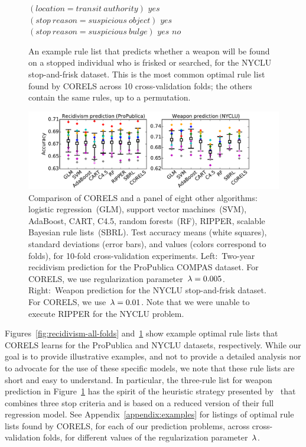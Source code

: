 \begin{figure}[t!]
\begin{algorithmic}
\State \bif $(location = transit~authority)$ \bthen $yes$
\State \belif $(stop~reason = suspicious~object)$ \bthen $yes$
\State \belif $(stop~reason = suspicious~bulge)$ \bthen $yes$
\State \belse $no$
\end{algorithmic}
\caption{An example rule list that predicts whether a weapon will be found on a
stopped individual who is frisked or searched, for the NYCLU stop-and-frisk dataset.
%
This is the most common optimal rule list found by CORELS across 10 cross-validation
folds; the others contain the same rules, up to a permutation.
}
\label{fig:weapon-rule-list}
\end{figure}

\begin{figure}[t!]
\begin{center}
\includegraphics[trim={14mm, 5mm, 30mm, 5mm},
width=\textwidth]{figs/compare-compas-weapon.pdf}
\end{center}
\caption{Comparison of CORELS and a panel of eight other algorithms:
logistic regression~(GLM), support vector machines~(SVM),
AdaBoost, CART, C4.5, random forests~(RF), RIPPER,
scalable Bayesian rule lists~(SBRL).
%
Test accuracy means (white squares),
standard deviations (error bars),
and values (colors correspond to folds),
for 10-fold cross-validation experiments.
%
Left:~Two-year recidivism prediction for the ProPublica COMPAS dataset.
%
For CORELS, we use regularization parameter~${{\lambda}=0.005}$.
%
Right:~Weapon prediction for the NYCLU stop-and-frisk dataset.
%
For CORELS, we use~${{\lambda}=0.01}$.
%
Note that we were unable to execute RIPPER for the NYCLU problem.
}
\label{fig:comparison}
\end{figure}

Figures~\ref{fig:recidivism-all-folds} and~\ref{fig:weapon-rule-list}
show example optimal rule lists that CORELS learns
for the ProPublica and NYCLU datasets, respectively.
%
While our goal is to provide illustrative examples, and not to provide a
detailed analysis nor to advocate for the use of these specific models,
we note that these rule lists are short and easy to understand.
%
In particular, the three-rule list for weapon prediction
in Figure~\ref{fig:weapon-rule-list} has the spirit of the heuristic
strategy presented by~\citet{Goel16} that combines three stop criteria
and is based on a reduced version of their full regression model.
%
See Appendix~\ref{appendix:examples} for listings of optimal rule lists found
by CORELS, for each of our prediction problems, across cross-validation folds,
for different values of the regularization parameter~${\lambda}$.


